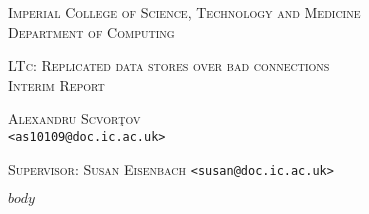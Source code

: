 \documentclass[11pt, a4paper, titlepage]{article}
\makeatletter
\newcommand{\mytitle}{LTc: Replicated data stores over bad connections\\[0.4cm]Interim Report}
\newcommand{\myauthor}{Alexandru Scvor\c tov}
\newcommand{\myemail}{\email{<as10109@doc.ic.ac.uk>}}
\newcommand{\email}[1]{\nolinkurl{#1}}
\makeatother
\begin{document}
\begin{titlepage}

  \begin{center}
    \textsc{Imperial College of Science, Technology and Medicine}\\[0.1cm]
    \textsc{Department of Computing}

    \vspace{3cm}

    \textsc{\Large \mytitle}

    \vspace{1cm}

    \textsc{\Large \myauthor}\\[0.1cm]
    \myemail

    \vspace{2cm}

    \textsc{Supervisor: Susan Eisenbach} \email{<susan@doc.ic.ac.uk>}
  \end{center}

\end{titlepage}

$body$



\end{document}
